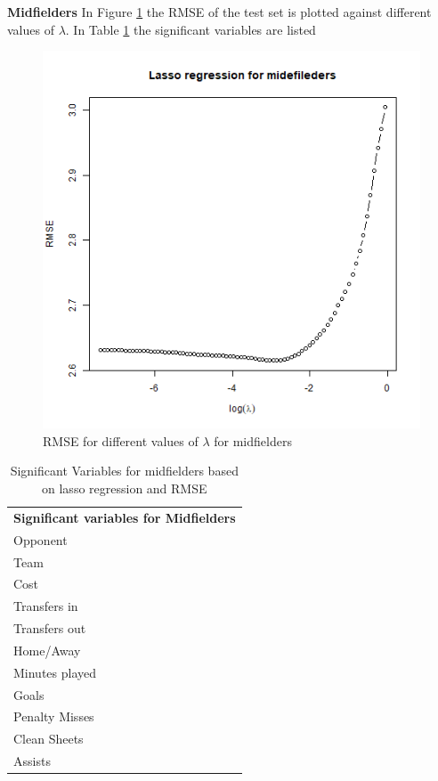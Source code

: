 \textbf{Midfielders}
In Figure \ref{fig:lasso_MID} the RMSE of the test set is plotted against different values of $\lambda$. In Table \ref{tab:sig_var_MID} the significant variables are listed

\begin{figure}[H]
    \centering
    \includegraphics[scale=0.55]{fig/chapter_6/lasso_MID.png}
    \caption{RMSE for different values of $\lambda$ for midfielders}
\label{fig:lasso_MID}    
\end{figure}

\begin{table}[H]
\centering
\caption{Significant Variables for midfielders based on lasso regression and RMSE}
\label{tab:sig_var_MID}
\begin{tabular}{l}
\textbf{Significant variables for Midfielders }\\
Opponent                              \\
Team                                  \\
Cost                                  \\
Transfers in                          \\
Transfers out                         \\
Home/Away                             \\
Minutes played                        \\
Goals
        \\
Penalty Misses
        \\
Clean Sheets
        \\
Assists
\end{tabular}
\end{table}

